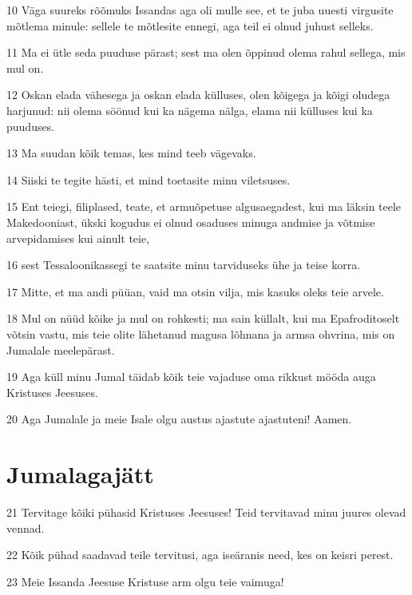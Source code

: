 \par 10 Väga suureks rõõmuks Issandas aga oli mulle see, et te juba uuesti virgusite mõtlema minule: sellele te mõtlesite ennegi, aga teil ei olnud juhust selleks.
\par 11 Ma ei ütle seda puuduse pärast; sest ma olen õppinud olema rahul sellega, mis mul on.
\par 12 Oskan elada vähesega ja oskan elada külluses, olen kõigega ja kõigi oludega harjunud: nii olema söönud kui ka nägema nälga, elama nii külluses kui ka puuduses.
\par 13 Ma suudan kõik temas, kes mind teeb vägevaks.
\par 14 Siiski te tegite hästi, et mind toetasite minu viletsuses.
\par 15 Ent teiegi, filiplased, teate, et armuõpetuse algusaegadest, kui ma läksin teele Makedooniast, ükski kogudus ei olnud osaduses minuga andmise ja võtmise arvepidamises kui ainult teie,
\par 16 sest Tessaloonikassegi te saatsite minu tarviduseks ühe ja teise korra.
\par 17 Mitte, et ma andi püüan, vaid ma otsin vilja, mis kasuks oleks teie arvele.
\par 18 Mul on nüüd kõike ja mul on rohkesti; ma sain küllalt, kui ma Epafroditoselt võtsin vastu, mis teie olite lähetanud magusa lõhnana ja armsa ohvrina, mis on Jumalale meelepärast.
\par 19 Aga küll minu Jumal täidab kõik teie vajaduse oma rikkust mööda auga Kristuses Jeesuses.
\par 20 Aga Jumalale ja meie Isale olgu austus ajastute ajastuteni! Aamen.

\section*{Jumalagajätt}

\par 21 Tervitage kõiki pühasid Kristuses Jeesuses! Teid tervitavad minu juures olevad vennad.
\par 22 Kõik pühad saadavad teile tervitusi, aga iseäranis need, kes on keisri perest.
\par 23 Meie Issanda Jeesuse Kristuse arm olgu teie vaimuga!




